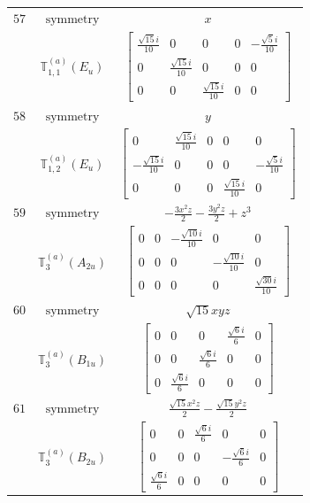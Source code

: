 \documentclass[fleqn,8pt,landscape]{jsarticle}
\begin{document}
\begin{longtable}{ccc}
$ 57 $ & $ \text{symmetry} $ & $ x $ \\
$  $ & $ \mathbb{T}_{1,1}^{(a)}(E_{u}) $ & $ \begin{bmatrix} \frac{\sqrt{15} i}{10} & 0 & 0 & 0 & - \frac{\sqrt{5} i}{10} \\ 0 & \frac{\sqrt{15} i}{10} & 0 & 0 & 0 \\ 0 & 0 & \frac{\sqrt{15} i}{10} & 0 & 0 \end{bmatrix} $ \\ \hline
$ 58 $ & $ \text{symmetry} $ & $ y $ \\
$  $ & $ \mathbb{T}_{1,2}^{(a)}(E_{u}) $ & $ \begin{bmatrix} 0 & \frac{\sqrt{15} i}{10} & 0 & 0 & 0 \\ - \frac{\sqrt{15} i}{10} & 0 & 0 & 0 & - \frac{\sqrt{5} i}{10} \\ 0 & 0 & 0 & \frac{\sqrt{15} i}{10} & 0 \end{bmatrix} $ \\ \hline
$ 59 $ & $ \text{symmetry} $ & $ - \frac{3 x^{2} z}{2} - \frac{3 y^{2} z}{2} + z^{3} $ \\
$  $ & $ \mathbb{T}_{3}^{(a)}(A_{2u}) $ & $ \begin{bmatrix} 0 & 0 & - \frac{\sqrt{10} i}{10} & 0 & 0 \\ 0 & 0 & 0 & - \frac{\sqrt{10} i}{10} & 0 \\ 0 & 0 & 0 & 0 & \frac{\sqrt{30} i}{10} \end{bmatrix} $ \\ \hline
$ 60 $ & $ \text{symmetry} $ & $ \sqrt{15} x y z $ \\
$  $ & $ \mathbb{T}_{3}^{(a)}(B_{1u}) $ & $ \begin{bmatrix} 0 & 0 & 0 & \frac{\sqrt{6} i}{6} & 0 \\ 0 & 0 & \frac{\sqrt{6} i}{6} & 0 & 0 \\ 0 & \frac{\sqrt{6} i}{6} & 0 & 0 & 0 \end{bmatrix} $ \\ \hline
$ 61 $ & $ \text{symmetry} $ & $ \frac{\sqrt{15} x^{2} z}{2} - \frac{\sqrt{15} y^{2} z}{2} $ \\
$  $ & $ \mathbb{T}_{3}^{(a)}(B_{2u}) $ & $ \begin{bmatrix} 0 & 0 & \frac{\sqrt{6} i}{6} & 0 & 0 \\ 0 & 0 & 0 & - \frac{\sqrt{6} i}{6} & 0 \\ \frac{\sqrt{6} i}{6} & 0 & 0 & 0 & 0 \end{bmatrix} $ \\ \hline

\end{longtable}
\end{document}

